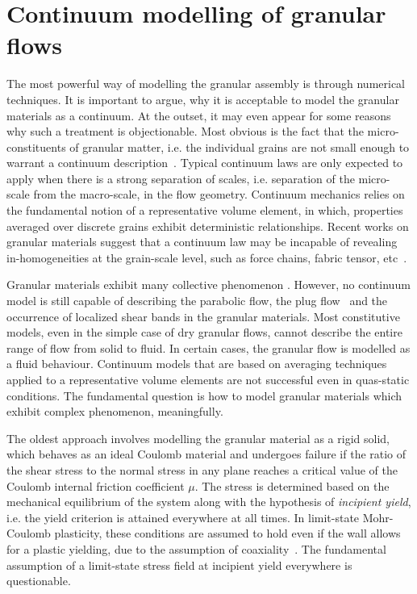 \section{Continuum modelling of granular flows}

The most powerful way of modelling the granular assembly is through numerical 
techniques. It is important to argue, why it is acceptable to model the 
granular materials as a continuum. At the outset, it may even appear for some 
reasons why such a treatment is objectionable. Most obvious is the fact that 
the micro-constituents of granular matter, i.e. the individual grains are not 
small enough to warrant a continuum description~\citep{Kamrin2007}. Typical 
continuum laws are only expected to apply when there is a strong separation of 
scales, i.e. separation of the micro-scale from the macro-scale, in the flow 
geometry. Continuum mechanics relies on the fundamental notion of a 
representative volume element, in which, properties averaged over discrete 
grains exhibit deterministic relationships. Recent works on granular 
materials suggest that a continuum law may be incapable of revealing 
in-homogeneities at the grain-scale level, such as force 
chains, fabric tensor, etc~\citep{Rycroft2009b}. 

Granular materials exhibit many collective phenomenon \citep{Jaeger1996}. 
However, no continuum model is still capable of describing the parabolic flow, 
the plug flow~\citep{Rycroft2006} and the occurrence of localized shear bands 
in the granular materials. Most constitutive models, even in the simple case 
of dry granular flows, cannot describe the entire range of flow from solid to 
fluid. In certain cases, the granular flow is modelled as a fluid behaviour. 
Continuum models that are based on averaging techniques applied to a 
representative volume elements are not successful even in quas-static 
conditions. The fundamental question is how to model granular materials which 
exhibit complex phenomenon, meaningfully. 

The oldest approach involves modelling the granular material as a rigid solid, 
which behaves as an ideal Coulomb material and undergoes failure if the ratio 
of the shear stress to the normal stress in any plane reaches a critical value 
of the Coulomb internal friction coefficient $\mu$. The stress is determined 
based on the mechanical equilibrium of the system along with the hypothesis of 
\textit{incipient yield}, i.e. the yield criterion is attained everywhere at 
all times. In limit-state Mohr-Coulomb plasticity, these conditions are 
assumed to hold even if the wall allows for a plastic yielding, due to the 
assumption of coaxiality~\citep{Rycroft2009b}. The fundamental assumption of a 
limit-state stress field at incipient yield everywhere is questionable.

